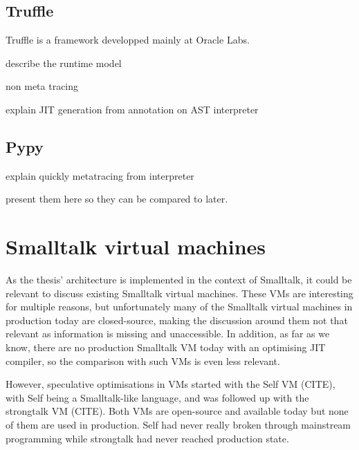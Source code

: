 \documentclass[a4paper,12pt,twoside]{../includes/ThesisStyle}
\begin{document}
\subsection{Truffle}

Truffle is a framework developped mainly at Oracle Labs. 

describe the runtime model

non meta tracing

explain JIT generation from annotation on AST interpreter

\subsection{Pypy}

explain quickly metatracing from interpreter

present them here so they can be compared to later.

\section{Smalltalk virtual machines}

As the thesis' architecture is implemented in the context of Smalltalk, it could be relevant to discuss existing Smalltalk virtual machines. These VMs are interesting for multiple reasons, but unfortunately many of the Smalltalk virtual machines in production today are closed-source, making the discussion around them not that relevant as information is missing and unaccessible. In addition, as far as we know, there are no production Smalltalk VM today with an optimising JIT compiler, so the comparison with such VMs is even less relevant. 

However, speculative optimisations in VMs started with the Self VM (CITE), with Self being a Smalltalk-like language, and was followed up with the strongtalk VM (CITE). Both VMs are open-source and available today but none of them are used in production. Self had never really broken through mainstream programming while strongtalk had never reached production state.

\ifx\wholebook\relax\else
    
\end{document}
